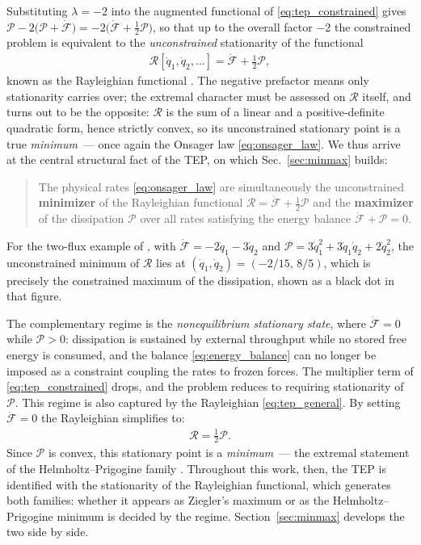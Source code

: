 \documentclass[aip,pof,reprint,amsmath,amssymb,longbibliography]{revtex4-2}
\begin{document}
Substituting $\lambda = -2$ into the augmented functional of \eqref{eq:tep_constrained} gives $\mathcal{P} - 2\big(\mathcal{P} + \dot{\mathcal{F}}\big) = -2\big(\dot{\mathcal{F}} + \tfrac{1}{2}\mathcal{P}\big)$, so that up to the overall factor $-2$ the constrained problem is equivalent to the \textit{unconstrained} stationarity of the functional
\begin{align}
    \mathcal{R}[\dot{q}_1, \dot{q}_2, \ldots] = \dot{\mathcal{F}} + \tfrac{1}{2}\mathcal{P}, \label{eq:tep_general}
\end{align}
known as the Rayleighian functional \cite{rayleigh1873, doi2011}. The negative prefactor means only stationarity carries over; the extremal character must be assessed on $\mathcal{R}$ itself, and turns out to be the opposite: $\mathcal{R}$ is the sum of a linear and a positive-definite quadratic form, hence strictly convex, so its unconstrained stationary point is a true \textit{minimum}~--- once again the Onsager law \eqref{eq:onsager_law}. We thus arrive at the central structural fact of the TEP, on which Sec.~\ref{sec:minmax} builds:
\begin{quote}
    The physical rates \eqref{eq:onsager_law} are simultaneously the unconstrained \textbf{minimizer} of the Rayleighian functional $\mathcal{R} = \dot{\mathcal{F}} + \tfrac{1}{2}\mathcal{P}$ and the \textbf{maximizer} of the dissipation $\mathcal{P}$ over all rates satisfying the energy balance $\dot{\mathcal{F}} + \mathcal{P} = 0$.
\end{quote}

For the two-flux example of \cite[Fig.~1]{svoboda2023note}, with $\dot{\mathcal{F}} = -2\dot{q}_1 - 3\dot{q}_2$ and $\mathcal{P} = 3\dot{q}_1^2 + 3\dot{q}_1\dot{q}_2 + 2\dot{q}_2^2$, the unconstrained minimum of $\mathcal{R}$ lies at $(\dot{q}_1, \dot{q}_2) = (-2/15,\, 8/5)$, which is precisely the constrained maximum of the dissipation, shown as a black dot in that figure.

The complementary regime is the \textit{nonequilibrium stationary state}, where $\dot{\mathcal{F}} = 0$ while $\mathcal{P} > 0$: dissipation is sustained by external throughput while no stored free energy is consumed, and the balance \eqref{eq:energy_balance} can no longer be imposed as a constraint coupling the rates to frozen forces. The multiplier term of \eqref{eq:tep_constrained} drops, and the problem reduces to requiring stationarity of $\mathcal{P}$. This regime is also captured by the Rayleighian \eqref{eq:tep_general}. By setting $\dot{\mathcal{F}} = 0$ the Rayleighian simplifies to:
\begin{align}
    \mathcal{R} = \tfrac{1}{2} \mathcal{P}. \label{eq:tep_stationary}
\end{align}
Since $\mathcal{P}$ is convex, this stationary point is a \textit{minimum}~--- the extremal statement of the Helmholtz--Prigogine family \cite{helmholtz1868, kirchhoff1848}. Throughout this work, then, the TEP is identified with the stationarity of the Rayleighian functional, which generates both families: whether it appears as Ziegler's maximum or as the Helmholtz--Prigogine minimum is decided by the regime. Section~\ref{sec:minmax} develops the two side by side.
\end{document}
